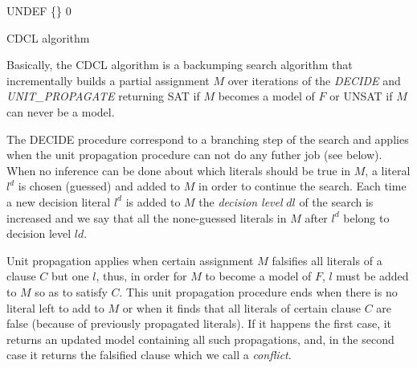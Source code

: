 \documentclass{llncs}
\begin{document}
\begin{algorithm}
 \BlankLine
 \Status \assign UNDEF\;
 \Model \assign \{\}\;
 \Dl \assign $0$\;
 \Return \Status
 \caption{CDCL algorithm}
 \label{alg:cdcl}
\end{algorithm}

Basically, the CDCL algorithm is a backumping search algorithm 
that incrementally builds a partial assignment $M$ over iterations of the
\emph{DECIDE} and \emph{UNIT\_PROPAGATE} returning SAT if $M$ becomes a model of $F$ or 
UNSAT if $M$ can never be a model. 

The DECIDE procedure
correspond to a branching step of the search and 
applies when the unit propagation procedure can not do any futher job (see below).
When no inference can be done about which literals should be true in $M$, a 
literal $l^d$ is chosen (guessed) and added to $M$ in order to 
continue the search.
Each time a new decision literal $l^d$ is added to $M$ the \emph{
decision level} $dl$ of the search is increased and we say that 
all the none-guessed literals in $M$ after $l^d$ belong to decision level $ld$.

Unit propagation
applies when certain assignment $M$ falsifies all literals of a clause $C$ 
but one $l$, thus, in order for $M$ to become a model of $F$, $l$ 
must be added to $M$ so as to satisfy $C$. This unit propagation procedure ends
when there is no literal left to add to $M$ or when it finds that all literals
of certain clause $C$ are false (because of previously propagated literals). 
If it happens the first case, it returns 
an updated model containing all such propagations, and, in the second case
it returns the falsified clause which we call a \emph{conflict}. 
\end{document}
